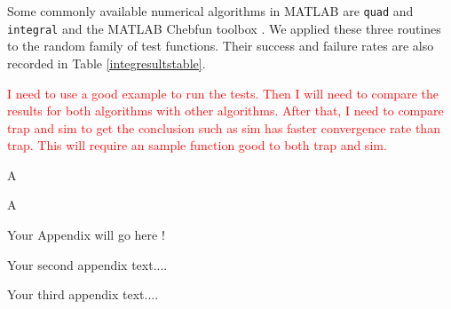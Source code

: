 \documentclass{iitthesis}
\theoremstyle{definition}
\theoremstyle{remark}
\begin{document}
Some commonly available numerical algorithms in MATLAB are {\tt quad} and {\tt integral} \cite{MAT8.1} and the MATLAB Chebfun toolbox \cite{TrefEtal12}. We applied these three routines to the random family of test functions.  Their success and failure rates are also recorded in Table \ref{integresultstable}.  %

\textcolor{red}{I need to use a good example to run the tests. Then I will need to compare the results for both algorithms with other algorithms. After that, I need to compare trap and sim to get the conclusion such as sim has faster convergence rate than trap. This will require an sample function good to both trap and sim.}




A



A

\clearpage


%
%

\appendix



Your Appendix will go here !



Your second appendix text....


Your third appendix text....
%
%

%


\end{document}
